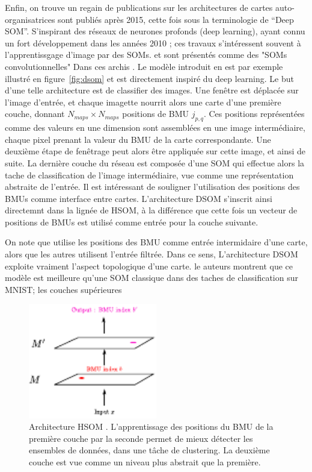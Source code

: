\documentclass[../main]{subfiles}
\begin{document}
Enfin, on trouve un regain de publications sur les architectures de cartes auto-organisatrices sont publiés après 2015, cette fois sous la terminologie de “Deep SOM”. S'inspirant des réseaux de neurones profonds (deep learning), ayant connu un fort développement dans les années 2010 \cite{lecun_deep_2015}; ces travaux s'intéressent souvent à l'apprentissgage d'image par des SOMs. \cite{Liu2015DeepSM,hankins_somnet_2018,wickramasinghe_deep_2019,aly_deep_2020,sakkari_convolutional_2020,dozono_convolutional_2016,nawaratne_hierarchical_2020,mici_self-organizing_2018} et sont présentés comme des "SOMs convolutionnelles"
Dans ces archis \cite{Liu2015DeepSM,dozono_convolutional_2016}.
Le modèle introduit en \cite{Liu2015DeepSM} est par exemple illustré en figure~\ref{fig:dsom} et est directement inspiré du deep learning. Le but d'une telle architecture est de classifier des images. Une fenêtre est déplacée sur l'image d'entrée, et chaque imagette nourrit alors une carte d'une première couche, donnant $N_{maps}  \times N_{maps}$ positions de BMU $j_{p,q}$. Ces positions représentées comme des valeurs en une dimension sont assemblées en une image intermédiaire, chaque pixel prenant la valeur du BMU de la carte correspondante. Une deuxième étape de fenêtrage peut alors être appliquée sur cette image, et ainsi de suite. La dernière couche du réseau est composée d'une SOM qui effectue alors la tache de classification de l'image intermédiaire, vue comme une représentation abstraite  de l'entrée.
Il est intéressant de souligner l'utilisation des positions des BMUs comme interface entre cartes. L'architecture DSOM s'inscrit ainsi directemnt dans la lignée de HSOM, à la différence que cette fois un vecteur de positions de BMUs est utilisé comme entrée pour la couche suivante.


On note que \cite{Liu2015DeepSM} utilise les positions des BMU comme entrée intermidaire d'une carte, alors que les autres utilisent l'entrée filtrée. Dans ce sens, L'architecture DSOM exploite vraiment l'aspect topologique d'une carte. le auteurs montrent que ce modèle est meilleure qu'une SOM classique dans des taches de classification sur MNIST; les couches supérieures 

\begin{figure}
    \centering
    \includegraphics[width=0.5\textwidth]{hsom.pdf}
    \caption{Architecture HSOM \cite{lampinen_clustering_1992}. L'apprentissage des positions du BMU de la première couche par la seconde permet de mieux détecter les ensembles de données, dans une tâche de clustering. La deuxième couche est vue comme un niveau plus abstrait que la première. \label{fig:hsom}}
\end{figure}
\end{document}
